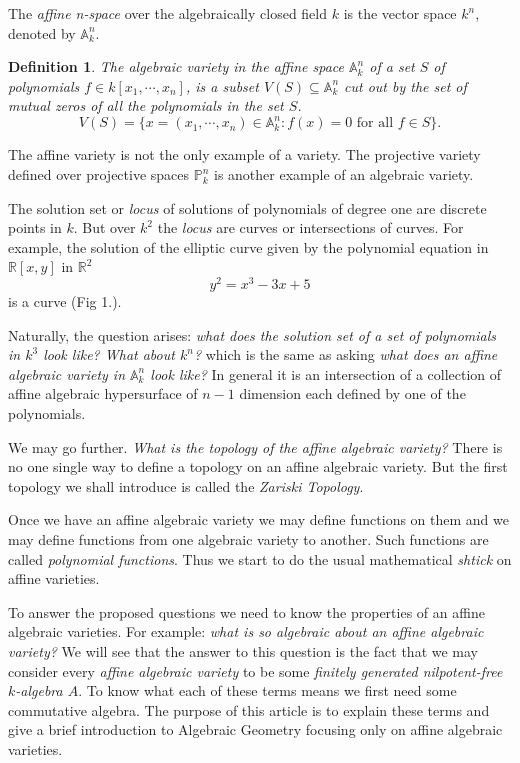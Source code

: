 \documentclass[]{report}
\newtheorem{defn}[theorem]{Definition}
\begin{document}
The \textit{affine n-space} over the algebraically closed field $k$ is the vector space $k^n$, denoted by $\mathbb{A}^n_k$.

\begin{defn} The algebraic variety \cite{vakil145} in the affine space $\mathbb{A}^n_k$ of a set $S$ of polynomials $f\in k[x_1,\cdots, x_n]$, is a subset $V(S)\subseteq \mathbb{A}^n_k$ cut out by the set of mutual zeros of all the polynomials in the set $S$.  
    $$V(S) = \{x = (x_1,\cdots,x_n) \in \mathbb{A}^n_k : f(x) = 0 \text{ for all } f \in S\}.$$
\end{defn}

The affine variety is not the only example of a variety. The projective variety defined over projective spaces $\mathbb{P}^n_k$ is another example of an algebraic variety.

The solution set or \textit{locus} of solutions of polynomials of degree one are discrete points in $k$. But over $k^2$ the \textit{locus} are curves or intersections of curves. For example, the solution of the elliptic curve given by the polynomial equation in $\mathbb{R}[x,y]$ in $\mathbb{R}^2$  
    $$y^2 = x^3 - 3x + 5$$
    is a curve (Fig 1.).

    Naturally, the question arises: \textit{what does the solution set of a set of polynomials in $k^3$ look like? What about $k^n$?} which is the same as asking \textit{what does an affine algebraic variety in $\mathbb{A}^n_k$ look like?} In general it is an intersection of a collection of affine algebraic hypersurface of $n-1$ dimension each defined by one of the polynomials.

    We may go further. \textit{What is the topology of the affine algebraic variety?} There is no one single way to define a topology on an affine algebraic variety. But the first topology we shall introduce is called the \textit{Zariski Topology}.

    Once we have an affine algebraic variety we may define functions on them and we may define functions from one algebraic variety to another. Such functions are called \textit{polynomial functions}. Thus we start to do the usual mathematical \textit{shtick} on affine varieties.

    To answer the proposed questions we need to know the properties of an affine algebraic varieties. For example: \textit{what is so algebraic about an affine algebraic variety?} We will see that the answer to this question is the fact that we may consider every \textit{affine algebraic variety} to be some \textit{finitely generated nilpotent-free $k$-algebra $A$}. To know what each of these terms means we first need some commutative algebra. The purpose of this article is to explain these terms and give a brief introduction to Algebraic Geometry focusing only on affine algebraic varieties.
\end{document}
